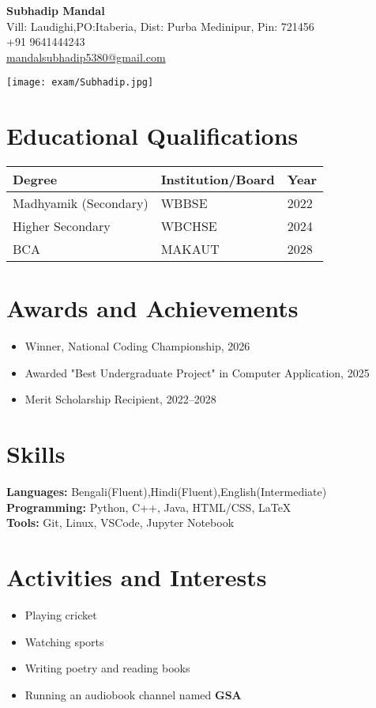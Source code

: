 \documentclass[11pt,a4paper]{article}
\begin{document}
\begin{minipage}{0.7\textwidth}
    {\LARGE \textbf{Subhadip Mandal}}\\
    Vill: Laudighi,PO:Itaberia, Dist: Purba Medinipur, Pin: 721456 \\
    +91 9641444243 \\
    \href{mailto:mandalsubhadip5380@gmail.com}{mandalsubhadip5380@gmail.com}
\end{minipage}
\begin{minipage}{0.29\textwidth}
    \begin{flushright}
        \texttt{[image: exam/Subhadip.jpg]} %
\vspace{0.5cm}
    \end{flushright}
\end{minipage}


\section*{Educational Qualifications}
\begin{tabular}{ | p{6cm} | p{6cm} | p{2cm} | }
 \hline
 \textbf{Degree} & \textbf{Institution/Board} & \textbf{Year} \\
 \hline
 Madhyamik (Secondary) & WBBSE & 2022 \\
 \hline
 Higher Secondary & WBCHSE & 2024 \\
 \hline
 BCA & MAKAUT & 2028 \\
 \hline
\end{tabular}

\vspace{0.5cm}

\section*{Awards and Achievements}
\begin{itemize}
    \item Winner, National Coding Championship, 2026
    \item Awarded "Best Undergraduate Project" in Computer Application, 2025
    \item Merit Scholarship Recipient, 2022–2028
\end{itemize}

\section*{Skills}
\textbf{Languages:} Bengali(Fluent),Hindi(Fluent),English(Intermediate) \\
\textbf{Programming:} Python, C++, Java, HTML/CSS, LaTeX \\
\textbf{Tools:} Git, Linux, VSCode, Jupyter Notebook

\section*{Activities and Interests}
\begin{itemize}
    \item Playing cricket
    \item Watching sports
    \item Writing poetry and reading books
    \item Running an audiobook channel named \textbf{GSA}
\end{itemize}
\end{document}
